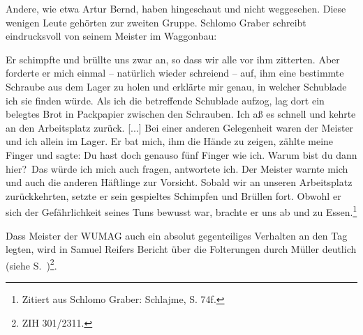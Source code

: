 Andere, wie etwa Artur Bernd, haben \glqq hingeschaut und nicht weggesehen\grqq. Diese wenigen Leute gehörten zur zweiten Gruppe. Schlomo Graber schreibt eindrucksvoll von seinem Meister im Waggonbau:

\begin{leftbar}
Er schimpfte und brüllte uns zwar an, so dass wir alle vor ihm zitterten. Aber forderte er mich einmal -- natürlich wieder schreiend -- auf, ihm eine bestimmte Schraube aus dem Lager zu holen und erklärte mir genau, in welcher Schublade ich sie finden würde. Als ich die betreffende Schublade aufzog, lag dort ein belegtes Brot in Packpapier zwischen den Schrauben. Ich aß es schnell und kehrte an den Arbeitsplatz zurück. [...] Bei einer anderen Gelegenheit waren der Meister und ich allein im Lager. Er bat mich, ihm die Hände zu zeigen, zählte meine Finger und sagte: \glqq Du hast doch genauso fünf Finger wie ich. Warum bist du dann hier?\grqq~Das würde ich mich auch fragen, antwortete ich. Der Meister warnte mich und auch die anderen Häftlinge zur Vorsicht. Sobald wir an unseren Arbeitsplatz zurückkehrten, setzte er sein gespieltes Schimpfen und Brüllen fort. Obwohl er sich der Gefährlichkeit seines Tuns bewusst war, brachte er uns ab und zu Essen.\footnote{Zitiert aus Schlomo Graber: Schlajme, S. 74f.}
\end{leftbar}
Dass Meister der WUMAG auch ein absolut gegenteiliges Verhalten an den Tag legten, wird in Samuel Reifers Bericht über die Folterungen durch Müller deutlich (siehe S.~\pageref{muller})\footnote{ZIH 301/2311.}.
